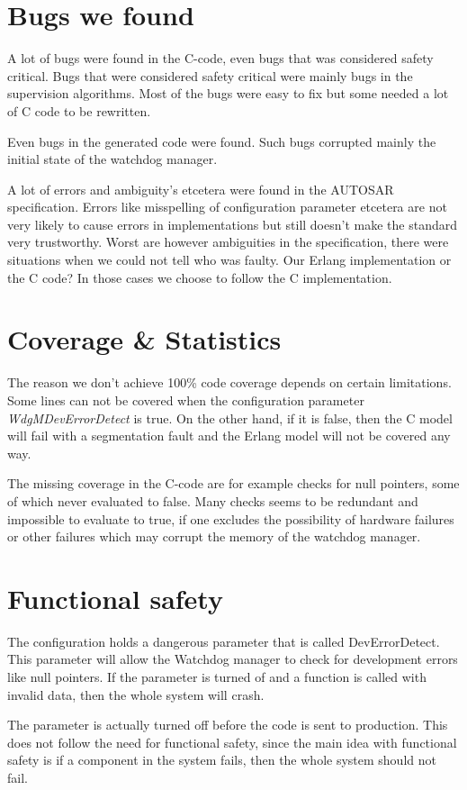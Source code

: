 \documentclass[a4paper]{article}
\begin{document}
\section{Bugs we found}
A lot of bugs were found in the C-code, even bugs that was considered safety
critical.  Bugs that were considered safety critical were mainly bugs in the
supervision algorithms.  Most of the bugs were easy to fix but some needed a
lot of C code to be rewritten.

Even bugs in the generated code were found. Such bugs corrupted mainly the
initial state of the watchdog manager.

A lot of errors and ambiguity's etcetera were found in the AUTOSAR
specification. Errors like misspelling of configuration parameter etcetera are
not very likely to cause errors in implementations but still doesn't make the
standard very trustworthy. Worst are however ambiguities in the specification,
there were situations when we could not tell who was faulty. Our Erlang
implementation or the C code? In those cases we choose to follow the C
implementation.

\section{Coverage \& Statistics}
The reason we don't achieve 100\% code coverage depends on certain limitations.
Some lines can not be covered when the configuration parameter
\emph{WdgMDevErrorDetect} is true. On the other hand, if it is
false, then the C model will fail with a segmentation fault and the
Erlang model will not be covered any way.

The missing coverage in the C-code are for example checks for null
pointers, some of which never evaluated to false. Many checks seems to be
redundant and impossible to evaluate to true, if one excludes the possibility
of hardware failures or other failures which may corrupt the memory of the
watchdog manager.

\section{Functional safety}
The configuration holds a dangerous parameter that is called
DevErrorDetect. This parameter will allow the Watchdog manager to
check for development errors like null pointers. If the parameter is
turned of and a function is called with invalid data, then the whole
system will crash.

The parameter is actually turned off before the code is sent to
production. This does not follow the need for functional safety, since
the main idea with functional safety is if a component in the system
fails, then the whole system should not fail.
\end{document}
